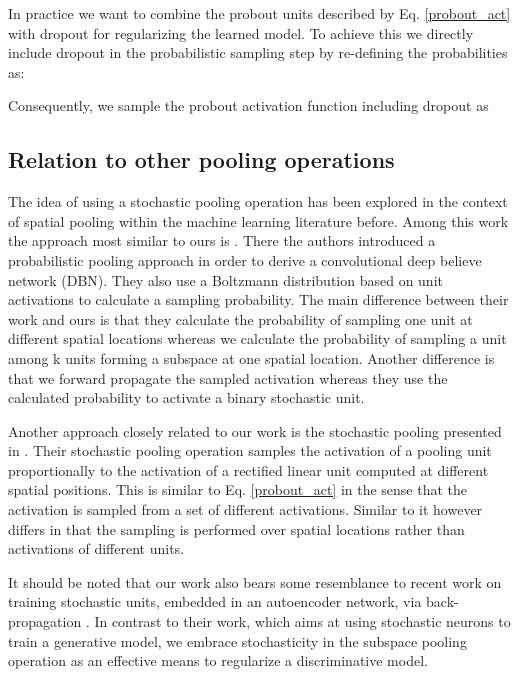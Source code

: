 \documentclass{article} \pdfoutput=1
\begin{document}
In practice we want to combine the probout units described by
Eq. \eqref{probout_act} with dropout for regularizing the learned
model.  To achieve this we directly include dropout in the
probabilistic sampling step by re-defining the probabilities as:

Consequently, we sample the probout activation function
including dropout  as


\subsection{Relation to other pooling operations}
The idea of using a stochastic pooling operation has been explored in
the context of spatial pooling within the machine learning literature
before. Among this work the approach most similar to ours is
\cite{Lee2009}. There the authors introduced a probabilistic
pooling approach in order to derive a convolutional deep believe
network (DBN). They also use a Boltzmann distribution based on unit
activations to calculate a sampling probability. The main difference
between their work and ours is that they calculate the probability of
sampling one unit at different spatial locations whereas we calculate
the probability of sampling a unit among k units forming a subspace at
one spatial location.
Another difference is that we forward propagate the sampled activation
 whereas they use the calculated probability to activate a binary
stochastic unit.

Another approach closely related to our work is the stochastic pooling
presented in \cite{ZeilerStochastic2013}. Their stochastic pooling
operation samples the activation of a pooling unit 
proportionally to the activation  of a rectified linear unit
\cite{Nair2010} computed at different spatial positions. This is
similar to Eq. \eqref{probout_act} in the sense that the activation is
sampled from a set of different activations. Similar to
\cite{Lee2009} it however differs in that the sampling is
performed over spatial locations rather than activations of different
units.

It should be noted that our work also bears some resemblance to recent
work on training stochastic units, embedded in an autoencoder network,
via back-propagation \cite{BengioStochastic2013,BengioGSN2013}. In contrast
to their work, which aims at using stochastic neurons to train a
generative model, we embrace stochasticity in the subspace pooling
operation as an effective means to regularize a discriminative
model.
\end{document}
